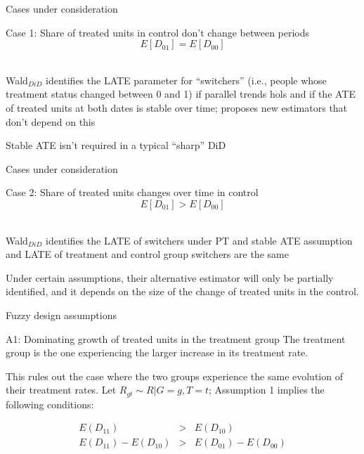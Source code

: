 \documentclass{beamer}
\begin{document}
\begin{frame}{Cases under consideration}

Case 1: Share of treated units in control don't change between periods $$E[D_{01}]=E[D_{00}]$$ \\

\bigskip

Wald$_{DiD}$ identifies the LATE parameter for ``switchers'' (i.e., people whose treatment status changed between 0 and 1) if parallel trends hols and if the ATE of treated units at both dates is stable over time; proposes new estimators that don't depend on this \\

\bigskip

Stable ATE isn't required in a typical ``sharp'' DiD

\end{frame}

\begin{frame}{Cases under consideration}

Case 2: Share of treated units changes over time in control $$E[D_{01}]>E[D_{00}]$$\\

\bigskip

Wald$_{DiD}$ identifies the LATE of switchers under PT and stable ATE assumption and LATE of treatment and control group switchers are the same \

\bigskip

Under certain assumptions, their alternative estimator will only be partially identified, and it depends on the size of the change of treated units in the control.  

\end{frame}

\begin{frame}{Fuzzy design assumptions}




\begin{block}{A1: Dominating growth of treated units in the treatment group}
The treatment group is the one experiencing the larger increase in its treatment rate. 
\end{block}
This rules out the case where the two groups experience the same evolution of their treatment rates. Let $R_{gt} \sim R|G=g, T=t$; Assumption 1 implies the following conditions:

\begin{eqnarray*}
E(D_{11})&>&E(D_{10}) \\
E(D_{11}) - E(D_{10}) &>& E(D_{01}) - E(D_{00})
\end{eqnarray*}

\end{frame}
\end{document}
